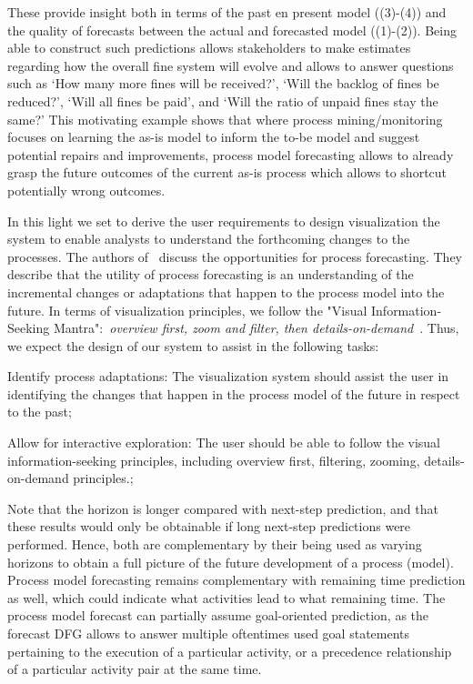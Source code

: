 These provide insight both in terms of the past en present model ((3)-(4)) and the quality of forecasts between the actual and forecasted model ((1)-(2)).
Being able to construct such predictions allows stakeholders to make estimates regarding how the overall fine system will evolve and allows to answer questions such as `How many more fines will be received?', `Will the backlog of fines be reduced?', `Will all fines be paid', and `Will the ratio of unpaid fines stay the same?'
This motivating example shows that where process mining/monitoring focuses on learning the as-is model to inform the to-be model and suggest potential repairs and improvements, process model forecasting allows to already grasp the future outcomes of the current as-is process which allows to shortcut potentially wrong outcomes. 

In this light we set to derive the user requirements to design visualization the system to enable analysts to understand the forthcoming changes to the processes. The authors of~\cite{DBLP:conf/bpm/PollPRRR18} discuss the opportunities for process forecasting. They describe that the utility of process forecasting is an understanding of the incremental changes or adaptations that happen to the process model into the future. In terms of visualization principles, we follow the "Visual Information-Seeking Mantra":~\emph{overview first, zoom and filter, then details-on-demand}~\cite{DBLP:conf/vl/Shneiderman96}. 
Thus, we expect the design of our system to assist in the following tasks:


\begin{requidescr}
	\item[Identify process adaptations:\namedlabel{req:adaptation}] The visualization system should assist the user in identifying the changes that happen in the process model of the future in respect to the past;
	\item[Allow for interactive exploration:\namedlabel{req:interactive}] The user should be able to follow the visual information-seeking principles, including overview first, filtering, zooming, details-on-demand principles.;
\end{requidescr} %


Note that the horizon is longer compared with next-step prediction, and that these results would only be obtainable if long next-step predictions were performed.
Hence, both are complementary by their being used as varying horizons to obtain a full picture of the future development of a process (model).
Process model forecasting remains complementary with remaining time prediction as well, which could indicate what activities lead to what remaining time.
The process model forecast can partially assume goal-oriented prediction, as the forecast DFG allows to answer multiple oftentimes used goal statements pertaining to the execution of a particular activity, or a precedence relationship of a particular activity pair \cite{DBLP:journals/tkdd/TeinemaaDRM19} at the same time.
